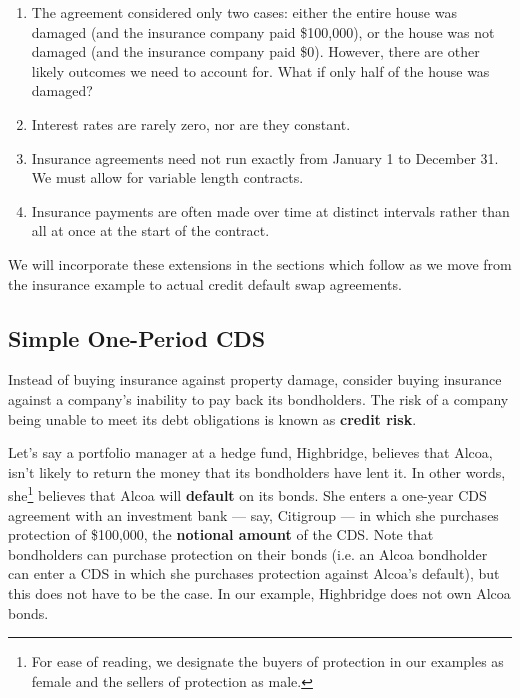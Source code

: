 \documentclass{jss}
\begin{document}
\begin{enumerate}

\item The agreement considered only two cases: either the entire house was damaged (and the insurance company paid \$100,000), or the house was not damaged (and the insurance company paid \$0). However, there are other likely outcomes we need to account for. What if only half of the house was damaged? 

\item Interest rates are rarely zero, nor are they constant. 

\item Insurance agreements need not run exactly from January 1 to December 31. We must allow for variable length contracts.

\item Insurance payments are often made over time at distinct intervals rather than all at once at the start of the contract.

\end{enumerate}

We will incorporate these extensions in the sections which follow as we move from the insurance example to actual credit default swap agreements.

\subsection{Simple One-Period CDS}
\label{sec:OnePeriod}

Instead of buying insurance against property damage, consider buying insurance against a company's inability to pay back its bondholders. The risk of a company being unable to meet its debt obligations is known as \textbf{credit risk}.

Let's say a portfolio manager at a hedge fund, Highbridge, believes that Alcoa, isn't likely to return the money that its bondholders have lent it. In other words, she\footnote{For ease of reading, we designate the buyers of protection in our examples as female and the sellers of protection as male.} believes that Alcoa will \textbf{default} on its bonds. She enters a one-year CDS agreement with an investment bank --- say, Citigroup --- in which she purchases protection of \$100,000, the \textbf{notional amount} of the CDS. Note that bondholders can purchase protection on their bonds (i.e. an Alcoa bondholder can enter a CDS in which she purchases protection against Alcoa's default), but this does not have to be the case. In our example, Highbridge does not own Alcoa bonds. 
\end{document}
